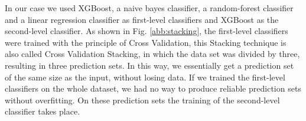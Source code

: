In our case we used XGBoost, a naive bayes classifier, a random-forest classifier and a linear regression classifier as first-level classifiers and XGBoost as the second-level classifier. As shown in Fig. \ref{abb:stacking}, the first-level classifiers were trained with the principle of Cross Validation, this Stacking technique is also called Cross Validation Stacking, in which the data set was divided by three, resulting in three prediction sets. In this way, we essentially get a prediction set of the same size as the input, without losing data. If we trained the first-level classifiers on the whole dataset, we had no way to produce reliable prediction sets without overfitting. On these prediction sets the training of the second-level classifier takes place. 
